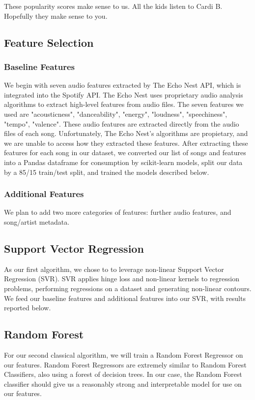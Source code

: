 \documentclass[journal]{IEEEtran}
\begin{document}
These popularity scores make sense to us. All the kids listen to Cardi B. Hopefully they make sense to you.

\subsection{Feature Selection}
\subsubsection{Baseline Features}
We begin with seven audio features extracted by The Echo Nest API, which is integrated into the Spotify API. The Echo Nest uses proprietary audio analysis algorithms to extract high-level features from audio files. The seven features we used are "acousticness", "danceability", "energy", "loudness", "speechiness", "tempo", "valence". These audio features are extracted directly from the audio files of each song. Unfortunately, The Echo Nest's algorithms are propietary, and we are unable to access how they extracted these features.
After extracting these features for each song in our dataset, we converted our list of songs and features into a Pandas dataframe for consumption by scikit-learn models, split our data by a 85/15 train/test split, and trained the models described below.
\subsubsection{Additional Features}
We plan to add two more categories of features: further audio features, and song/artist metadata.

\subsection{Support Vector Regression}
As our first algorithm, we chose to to leverage non-linear Support Vector Regression (SVR). SVR applies hinge loss and non-linear kernels to regression problems, performing regressions on a dataset and generating non-linear contours. We feed our baseline features and additional features into our SVR, with results reported below.

\subsection{Random Forest}
For our second classical algorithm, we will train a Random Forest Regressor on our features. Random Forest Regressors are extremely similar to Random Forest Classifiers, also using a forest of decision trees. In our case, the Random Forest classifier should give us a reasonably strong and interpretable model for use on our features.
\end{document}
